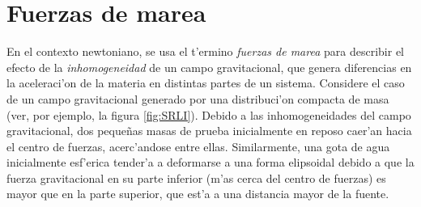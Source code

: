 \section{Fuerzas de marea}
En el contexto newtoniano, se usa el t'ermino \textit{fuerzas de marea} para describir el efecto de la \textit{inhomogeneidad} de un campo gravitacional, que genera diferencias en la aceleraci'on de la materia en distintas partes de un sistema. Considere el caso de un campo gravitacional generado por una distribuci'on compacta de masa (ver, por ejemplo, la figura \ref{fig:SRLI}). Debido a las inhomogeneidades del campo gravitacional, dos peque\~nas masas de prueba inicialmente en reposo caer'an hacia el centro de fuerzas, acerc'andose entre ellas. Similarmente, una gota de agua inicialmente esf'erica tender'a a deformarse a una forma elipsoidal debido a que la fuerza gravitacional en su parte inferior (m'as cerca del centro de fuerzas) es mayor que en la parte superior, que est'a a una distancia mayor de la fuente.

